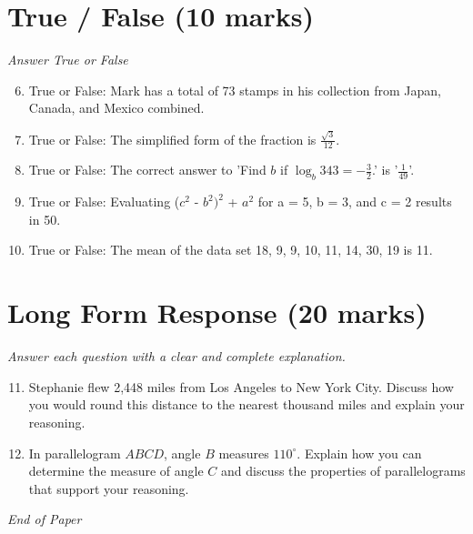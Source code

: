 \documentclass[12pt]{article}
\begin{document}
\section*{True / False (10 marks)}
\textit{Answer True or False}
\begin{enumerate}[label=\arabic*.]
\setcounter{enumi}{5}
\item True or False: Mark has a total of 73 stamps in his collection from Japan, Canada, and Mexico combined.
\item True or False: The simplified form of the fraction is \( \frac{\sqrt{3}}{12} \).
\item True or False: The correct answer to 'Find $b$ if $\log_{b}343=-\frac{3}{2}$.' is '\ensuremath{\frac{1}{49}}'.
\item True or False: Evaluating ($c^2$ - $b^2$$)^2$ + $a^2$ for a = 5, b = 3, and c = 2 results in 50.
\item True or False: The mean of the data set 18, 9, 9, 10, 11, 14, 30, 19 is 11.
\end{enumerate}

\section*{Long Form Response (20 marks)}
\textit{Answer each question with a clear and complete explanation.}
\begin{enumerate}[label=\arabic*.]
\setcounter{enumi}{10}
\item Stephanie flew 2,448 miles from Los Angeles to New York City. Discuss how you would round this distance to the nearest thousand miles and explain your reasoning.
\item In parallelogram \(ABCD\), angle \(B\) measures \(110^\circ\). Explain how you can determine the measure of angle \(C\) and discuss the properties of parallelograms that support your reasoning.
\end{enumerate}

\vfill
\noindent\textit{End of Paper}
\end{document}
